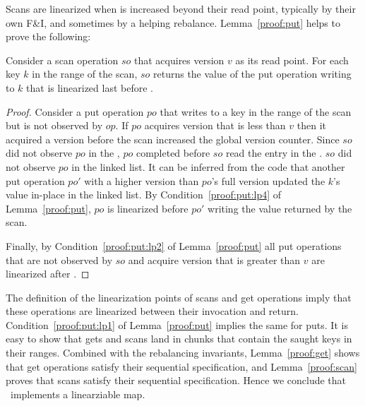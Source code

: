 Scans are linearized when  is increased beyond their read point, typically by their own F\&I, and sometimes by a helping rebalance. 
Lemma~\ref{proof:put} helps to prove the following:
\begin{lemma}
\label{proof:scan}
Consider a scan operation $so$ that acquires version $v$ as its read point. For each key $k$ in the range of the scan, $so$ returns the value of the put operation writing to $k$ that is linearized last before .
\end{lemma}
\begin{proof}

Consider a put operation $po$ that writes to a key in the range of the scan but is not observed by $op$. If $po$ acquires version that is less than $v$ then it acquired a version before the scan increased the global version counter. Since $so$ did not observe $po$ in the , $po$ completed before $so$ read the entry in the . $so$ did not observe $po$ in the linked list. It can be inferred from the code that another put operation $po'$ with a higher version than $po$'s full version updated the $k$'s value in-place in the linked list.
By Condition~\ref{proof:put:lp4} of Lemma~\ref{proof:put}, $po$ is linearized before $po'$ writing the value returned by the scan.

Finally, by Condition~\ref{proof:put:lp2} of Lemma~\ref{proof:put} all put operations that are not observed by $so$ and acquire version that is greater than $v$ are linearized after .
\end{proof}

The definition of the linearization points of scans and get operations imply that these operations are linearized between their invocation and return.
Condition~\ref{proof:put:lp1} of Lemma~\ref{proof:put} implies the same for puts. 
It is easy to show  that gets and scans land in chunks that contain the saught keys in their ranges. Combined with the rebalancing invariants,
Lemma~\ref{proof:get} shows that get operations satisfy their sequential specification, and Lemma~\ref{proof:scan} proves that scans satisfy their sequential specification. 
Hence we conclude that \kiwi\ implements a linearziable map. 


